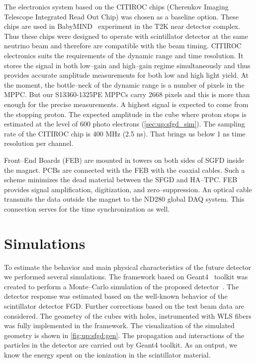 \documentclass[main.tex]{subfiles}
\begin{document}
The electronics system based on the CITIROC chips (Cherenkov Imaging Telescope Integrated Read Out Chip) was chosen as a baseline option. These chips are used in BabyMIND~\cite{Blondel2015b} experiment in the T2K near detector complex. Thus these chips were designed to operate with scintillator detector at the same neutrino beam and therefore are compatible with the beam timing. CITIROC electronics suits the requirements of the dynamic range and time resolution. It stores the signal in both low--gain and high--gain regime simultaneously and thus provides accurate amplitude measurements for both low and high light yield. At the moment, the bottle--neck of the dynamic range is a number of pixels in the MPPC. But our S13360-1325PE MPPCs carry 2668 pixels and this is more than enough for the precise measurements. A highest signal is expected to come from the stopping proton. The expected amplitude in the cube where proton stops is estimated at the level of 600 photo electrons (\autoref{sec:up:sfgd_sim}). The sampling rate of the CITIROC chip is 400 MHz (2.5 ns). That brings us below 1 ns time resolution per channel.

Front--End Boards (FEB) are mounted in towers on both sides of SGFD inside the magnet. PCBs are connected with the FEB with the coaxial cables. Such a scheme minimizes the dead material between the SFGD and HA--TPC. FEB provides signal amplification, digitization, and zero--suppression. An optical cable transmits the data outside the magnet to the ND280 global DAQ system. This connection serves for the time synchronization as well.

\section{Simulations}
\label{sec:up:sfgd_sim}
To estimate the behavior and main physical characteristics of the future detector we performed several simulations. The framework based on Geant4~\cite{Agostinelli2003} toolkit was created to perform a Monte--Carlo simulation of the proposed detector~\cite{ndUpRepo}. The detector response was estimated based on the well-known behavior of the scintillator detector FGD. Further corrections based on the test beam data are considered. The geometry of the cubes with holes, instrumented with WLS fibers was fully implemented in the framework. The visualization of the simulated geometry is shown in \autoref{fig:up:sfgd:gen}. The propagation and interactions of the particles in the detector are carried out by Geant4 toolkit. As an output, we know the energy spent on the ionization in the scintillator material.
\end{document}
